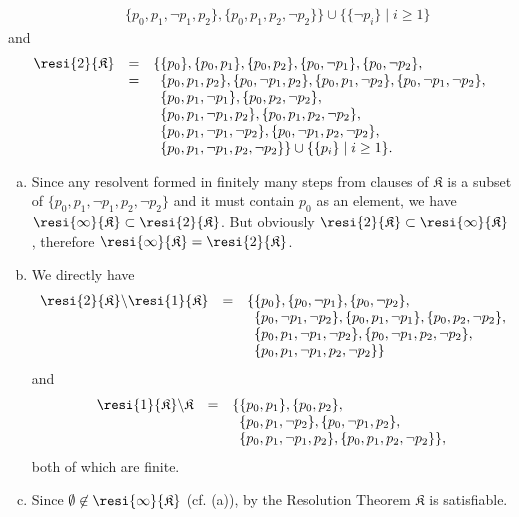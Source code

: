 \begin{enumerate}[1.]
\[\begin{array}{lll}
\ & \ & \phantom{ \{ } \{ p_0, p_1, \neg p_1, p_2 \}, \{ p_0, p_1, p_2, \neg p_2 \} \} \cup \{ \{ \neg p_i \} \mid i \geq 1 \}
\end{array}
\]
and
\[
\begin{array}{lll}
\resi{2}{\mathfrak{K}} & = & \{ \{ p_0 \}, \{ p_0, p_1 \}, \{ p_0, p_2 \}, \{ p_0, \neg p_1 \}, \{ p_0, \neg p_2 \}, \cr
\ & = & \phantom{ \{ } \{ p_0, p_1, p_2 \}, \{ p_0, \neg p_1, p_2 \}, \{ p_0, p_1, \neg p_2 \}, \{ p_0, \neg p_1, \neg p_2 \}, \cr
\ & \ & \phantom{ \} } \{ p_0, p_1, \neg p_1 \}, \{ p_0, p_2, \neg p_2 \}, \cr
\ & \ & \phantom{ \{ } \{ p_0, p_1, \neg p_1, p_2 \}, \{ p_0, p_1, p_2, \neg p_2 \}, \cr
\ & \ & \phantom{ \} } \{ p_0, p_1, \neg p_1, \neg p_2 \}, \{ p_0, \neg p_1, p_2, \neg p_2 \}, \cr
\ & \ & \phantom{ \{ } \{ p_0, p_1, \neg p_1, p_2, \neg p_2 \} \} \cup \{ \{ p_i \} \mid i \geq 1 \}.
\end{array}
\]
\begin{enumerate}[(a)]
\item Since any resolvent formed in finitely many steps from clauses of $\mathfrak{K}$ is a subset of $\{ p_0, p_1, \neg p_1, p_2, \neg p_2 \}$ and it must contain $p_0$ as an element, we have $\resi{\infty}{\mathfrak{K}} \subset \resi{2}{\mathfrak{K}}$. But obviously $\resi{2}{\mathfrak{K}} \subset \resi{\infty}{\mathfrak{K}}$, therefore $\resi{\infty}{\mathfrak{K}} = \resi{2}{\mathfrak{K}}$.
\item We directly have
\[
\begin{array}{lll}
\resi{2}{\mathfrak{K}} \backslash \resi{1}{\mathfrak{K}} & = & \{ \{ p_0 \}, \{ p_0, \neg p_1 \}, \{ p_0, \neg p_2 \}, \cr
\ & \ & \phantom{ \{ } \{ p_0, \neg p_1, \neg p_2 \}, \{ p_0, p_1, \neg p_1 \}, \{ p_0, p_2, \neg p_2 \}, \cr
\ & \ & \phantom{ \} } \{ p_0, p_1, \neg p_1, \neg p_2 \}, \{ p_0, \neg p_1, p_2, \neg p_2 \}, \cr
\ & \ & \phantom{ \{ } \{ p_0, p_1, \neg p_1, p_2, \neg p_2 \} \}
\end{array}
\]
and
\[
\begin{array}{lll}
\resi{1}{\mathfrak{K}} \backslash \mathfrak{K} & = & \{ \{ p_0, p_1 \}, \{ p_0, p_2 \}, \cr
\ & \ & \phantom{ \{ } \{ p_0, p_1, \neg p_2 \}, \{ p_0, \neg p_1, p_2 \}, \cr
\ & \ & \phantom{ \} } \{ p_0, p_1, \neg p_1, p_2 \}, \{ p_0, p_1, p_2, \neg p_2 \} \},
\end{array}
\]
both of which are finite.
\item Since $\emptyset \not\in \resi{\infty}{\mathfrak{K}}$ (cf. (a)), by the Resolution Theorem $\mathfrak{K}$ is satisfiable.
\end{enumerate}
\end{enumerate}
